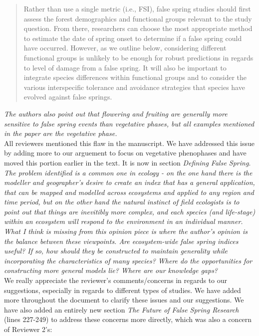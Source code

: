 \documentclass[11pt,a4paper]{article}
\begin{document}
\begin{quotation}
Rather than use a single metric (i.e., FSI), false spring studies should first assess the forest demographics and functional groups relevant to the study question. From there, researchers can choose the most appropriate method to estimate the date of spring onset to determine if a false spring could have occurred. However, as we outline below, considering different functional groups is unlikely to be enough for robust predictions in regards to level of damage from a false spring. It will also be important to integrate species differences within functional groups and to consider the various interspecific tolerance and avoidance strategies that species have evolved against false springs.
\end{quotation} 

\textit{The authors also point out that flowering and fruiting are generally more sensitive to false spring events than vegetative phases, but all examples mentioned in the paper are the vegetative phase.} \\

All reviewers mentioned this flaw in the manuscript. We have addressed this issue by adding more to our arguement to focus on vegetative phenophases and have moved this portion earlier in the text. It is now in section \textit{Defining False Spring}. \\

\textit{The problem identified is a common one in ecology - on the one hand there is the modeller and geographer's desire to create an index that has a general application, that can be mapped and modelled across ecosystems and applied to any region and time period, but on the other hand the natural instinct of field ecologists is to point out that things are inevitibly more complex, and each species (and life-stage) within an ecosystem will respond to the environment in an individual manner. What I think is missing from this opinion piece is where the author's opinion is the balance between these viewpoints.  Are ecosystem-wide false spring indices useful?  If so, how should they be constructed to maintain generality while incorporating the characteristics of many species?  Where do the opportunities for constructing more general models lie? Where are our knowledge gaps?} \\

We really appreciate the reviewer's comments/concerns in regards to our suggestions, especially in regards to different types of studies. We have added more throughout the document to clarify these issues and our suggestions.  %
We have also added an entirely new section \textit{The Future of False Spring Research} (lines 227-249) to address these concerns more directly, which was also a concern of Reviewer 2's: \\
\end{document}
